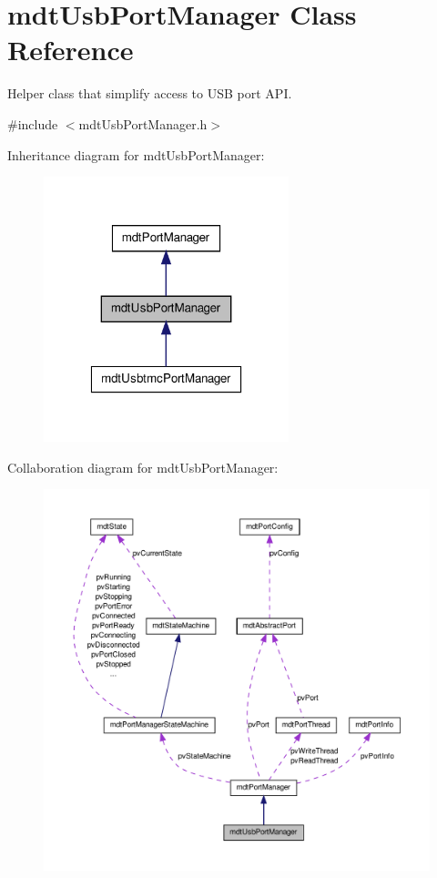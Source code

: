 \hypertarget{classmdt_usb_port_manager}{
\section{mdtUsbPortManager Class Reference}
\label{classmdt_usb_port_manager}
}


Helper class that simplify access to USB port API.  




{\ttfamily \#include $<$mdtUsbPortManager.h$>$}



Inheritance diagram for mdtUsbPortManager:\nopagebreak
\begin{figure}[H]
\begin{center}
\leavevmode
\includegraphics[width=202pt]{classmdt_usb_port_manager__inherit__graph}
\end{center}
\end{figure}


Collaboration diagram for mdtUsbPortManager:
\nopagebreak
\begin{figure}[H]
\begin{center}
\leavevmode
\includegraphics[width=400pt]{classmdt_usb_port_manager__coll__graph}
\end{center}
\end{figure}
